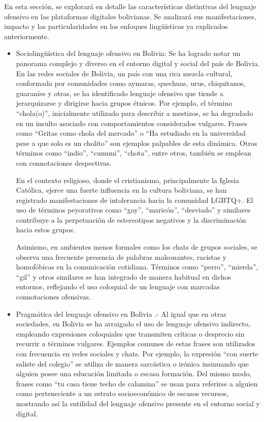 En esta sección, se explorará en detalle las características distintivas del lenguaje ofensivo en las plataformas digitales bolivianas. Se analizará sus manifestaciones, impacto y las particularidades  en los enfoques lingüísticos ya explicados anteriormente.

\begin{itemize}

	\item Sociolingüística del lenguaje ofensivo en Bolivia:  Se ha logrado notar un panorama complejo y diverso en el entorno digital y social del país de Bolivia. En las redes sociales de Bolivia, un país con una rica mezcla cultural, conformada por comunidades como aymaras, quechuas, urus, chiquitanos, guaraníes y otras, se ha identificado lenguaje ofensivo que tiende a jerarquizarse y dirigirse hacia grupos étnicos. Por ejemplo, el término ``chola(o)'', inicialmente utilizado para describir a mestizos, se ha degradado en un insulto asociado con comportamientos considerados vulgares. Frases como ``Gritas como chola del mercado'' o ``Ha estudiado en la universidad pese a que solo es un cholito'' son ejemplos palpables de esta dinámica. Otros términos como ``indio'', ``cunumi'', ``chota'', entre otros, también se emplean con connotaciones despectivas.
	
En el contexto religioso, donde el cristianismo, principalmente la Iglesia Católica, ejerce una fuerte influencia en la cultura boliviana, se han registrado manifestaciones de intolerancia hacia la comunidad LGBTQ+. El uso de términos peyorativos como ``gay'', ``maricón'', ``desviado'' y similares contribuye a la perpetuación de estereotipos negativos y la discriminación hacia estos grupos.

Asimismo, en ambientes menos formales como los chats de grupos sociales, se observa una frecuente presencia de palabras malsonantes, racistas y homofóbicas en la comunicación cotidiana. Términos como ``perro'', ``mierda'', ``gil'' y otros similares se han integrado de manera habitual en dichos entornos, reflejando el uso coloquial de un lenguaje con marcadas connotaciones ofensivas.

	\item Pragmática del lenguaje ofensivo en Bolivia .- Al igual que en otras sociedades, en Bolivia se ha arraigado el uso de lenguaje ofensivo indirecto, empleando expresiones coloquiales que transmiten críticas o desprecio sin recurrir a términos vulgares. Ejemplos comunes de estas frases son utilizados con frecuencia en redes sociales y chats. Por ejemplo, la expresión ``con suerte saliste del colegio'' se utiliza de manera sarcástica o irónica insinuando que alguien posee una educación limitada o escasa formación. Del mismo modo, frases como ``tu casa tiene techo de calamina'' se usan para referirse a alguien como perteneciente a un estrato socioeconómico de escasos recursos, mostrando así la sutilidad del lenguaje ofensivo presente en el entorno social y digital.
	

\end{itemize}
